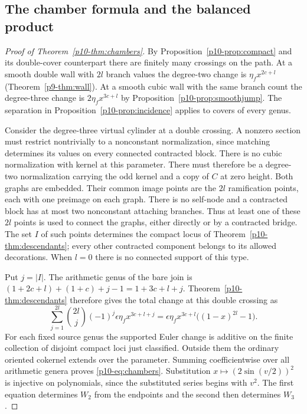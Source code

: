 \subsection{The chamber formula and the balanced product}\label{p10-sec:chamberproof}
\begin{proof}[Proof of Theorem~\ref{p10-thm:chambers}]
By Proposition~\ref{p10-prop:compact} and its double-cover counterpart
there are finitely many crossings on the path. At a smooth double
wall with $2l$ branch values the degree-two change is $\eta_f x^{2c+l}$
(Theorem~\ref{p9-thm:wall}). At a smooth cubic wall with the same
branch count the degree-three change is $2\eta_f x^{3c+l}$ by
Proposition~\ref{p10-prop:smoothjump}. The separation in
Proposition~\ref{p10-prop:incidence} applies to covers of every genus.

Consider the degree-three virtual cylinder at a double crossing.
A nonzero section must restrict nontrivially to a nonconstant
normalization, since matching determines its values on every
connected contracted block. There is no cubic normalization with
kernel at this parameter. There must therefore be a degree-two
normalization carrying the odd kernel and a copy of $C$ at zero
height. Both graphs are embedded. Their common image points are the
$2l$ ramification points, each with one preimage on each graph.
There is no self-node and a contracted block has at most two
nonconstant attaching branches. Thus at least one of these $2l$
points is used to connect the graphs, either directly or by a
contracted bridge. The set $I$ of such points determines the compact
locus of Theorem~\ref{p10-thm:descendants}; every other contracted
component belongs to its allowed decorations. When $l=0$ there
is no connected support of this type.

Put $j=|I|$. The arithmetic genus of the bare join is
$(1+2c+l)+(1+c)+j-1=1+3c+l+j$. Theorem~\ref{p10-thm:descendants}
therefore gives the total change at this double crossing as
\[
  \sum_{j=1}^{2l}\binom{2l}{j}(-1)^j\epsilon\eta_f x^{3c+l+j}
   =\epsilon\eta_f x^{3c+l}\big((1-x)^{2l}-1\big).
\]
For each fixed source genus the supported Euler change is additive
on the finite collection of disjoint compact loci just classified.
Outside them the ordinary oriented cokernel extends over the
parameter. Summing coefficientwise over all arithmetic genera proves
\eqref{p10-eq:chambers}. Substitution $x\mapsto (2\sin(v/2))^2$ is
injective on polynomials, since the substituted series begins with
$v^2$. The first equation determines $W_2$ from the endpoints and
the second then determines $W_3$.
\end{proof}

